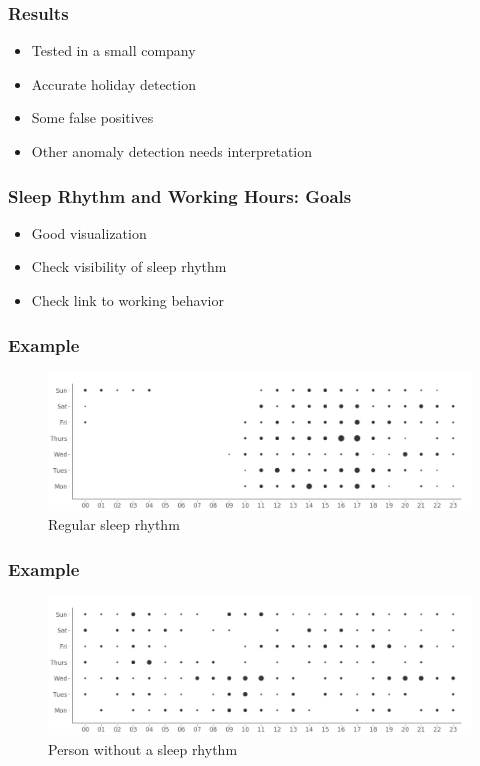 \documentclass[t]{beamer}
\begin{document}
\begin{frame}
    \frametitle{Results}
    \vspace{1cm}
    \begin{itemize}
        \item Tested in a small company
        \pause{}
        \item Accurate holiday detection
        \pause{}
        \item Some false positives
        \pause{}
        \item Other anomaly detection needs interpretation
    \end{itemize}
\end{frame}

\begin{frame}
    \frametitle{Sleep Rhythm and Working Hours: Goals}
    \vspace{1cm}
    \begin{itemize}
        \item Good visualization
        \pause{}
        \item Check visibility of sleep rhythm
        \pause{}
        \item Check link to working behavior
    \end{itemize}
\end{frame}

\begin{frame}
    \frametitle{Example}
    \vspace{1cm}
    \begin{figure}[H]
        \includegraphics[scale=0.22]{analysis/ordered-punchcard}
        \centering
        \caption{Regular sleep rhythm}
    \end{figure}
\end{frame}

\begin{frame}
    \frametitle{Example}
    \vspace{1cm}
    \begin{figure}[H]
        \includegraphics[scale=0.22]{analysis/random-punchcard}
        \centering
        \caption{Person without a sleep rhythm}
    \end{figure}
\end{frame}
\end{document}
